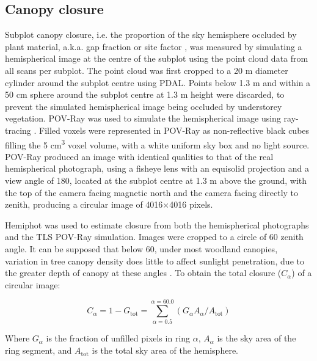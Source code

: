 \begin{refsection}
\subsection{Canopy closure}
\label{workflow:ssec:closure}

Subplot canopy closure, i.e. the proportion of the sky hemisphere occluded by plant material, a.k.a. gap fraction or site factor \citep{Jennings1999}, was measured by simulating a hemispherical image at the centre of the subplot using the point cloud data from all scans per subplot. The point cloud was first cropped to a 20 m diameter cylinder around the subplot centre using PDAL. Points below 1.3 m and within a 50 cm sphere around the subplot centre at 1.3 m height were discarded, to prevent the simulated hemispherical image being occluded by understorey vegetation. POV-Ray was used to simulate the hemispherical image using ray-tracing \citep{Povray2004}. Filled voxels were represented in POV-Ray as non-reflective black cubes filling the 5 cm\textsuperscript{3} voxel volume, with a white uniform sky box and no light source. POV-Ray produced an image with identical qualities to that of the real hemispherical photograph, using a fisheye lens with an equisolid projection and a view angle of 180\textdegree, located at the subplot centre at 1.3 m above the ground, with the top of the camera facing magnetic north and the camera facing directly to zenith, producing a circular image of 4016$\times$4016 pixels.

Hemiphot \citep{HemiPhot} was used to estimate closure from both the hemispherical photographs and the TLS POV-Ray simulation. Images were cropped to a circle of 60\textdegree{} zenith angle. It can be supposed that below 60\textdegree{}, under most woodland canopies, variation in tree canopy density does little to affect sunlight penetration, due to the greater depth of canopy at these angles \citep{Jupp2008}. To obtain the total closure ($C_{\alpha{}}$) of a circular image:

\begin{equation}
	C_{\alpha{}} = 1 - G_{\text{tot}} = \sum_{\alpha{} = 0.5}^{\alpha{} = 60.0}(G_{\alpha{}} A_{\alpha{}} / A_{\text{tot}})
\end{equation}

Where $G_{\alpha{}}$ is the fraction of unfilled pixels in ring $\alpha{}$, $A_{\alpha{}}$ is the sky area of the ring segment, and $A_{\text{tot}}$ is the total sky area of the hemisphere.


\end{refsection}
